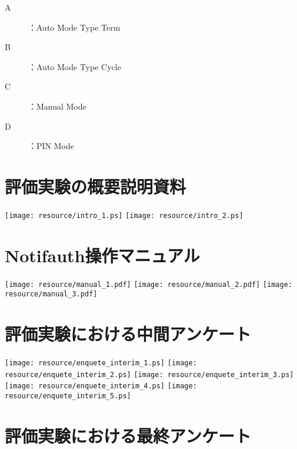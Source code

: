 \begin{description}
  \item[A]：Auto Mode Type Term
  \item[B]：Auto Mode Type Cycle
  \item[C]：Manual Mode
  \item[D]：PIN Mode
\end{description}

\newpage

\section{評価実験の概要説明資料}
\texttt{[image: resource/intro\_1.ps]}
\newpage
\texttt{[image: resource/intro\_2.ps]}
\newpage

\section{Notifauth操作マニュアル}
\texttt{[image: resource/manual\_1.pdf]}
\newpage
\texttt{[image: resource/manual\_2.pdf]}
\newpage
\texttt{[image: resource/manual\_3.pdf]}
\newpage

\section{評価実験における中間アンケート}\label{apdx:interimEnquete}
\texttt{[image: resource/enquete\_interim\_1.ps]}
\newpage
\texttt{[image: resource/enquete\_interim\_2.ps]}
\newpage
\texttt{[image: resource/enquete\_interim\_3.ps]}
\newpage
\texttt{[image: resource/enquete\_interim\_4.ps]}
\newpage
\texttt{[image: resource/enquete\_interim\_5.ps]}
\newpage

\section{評価実験における最終アンケート}\label{apdx:finalEnquete}

